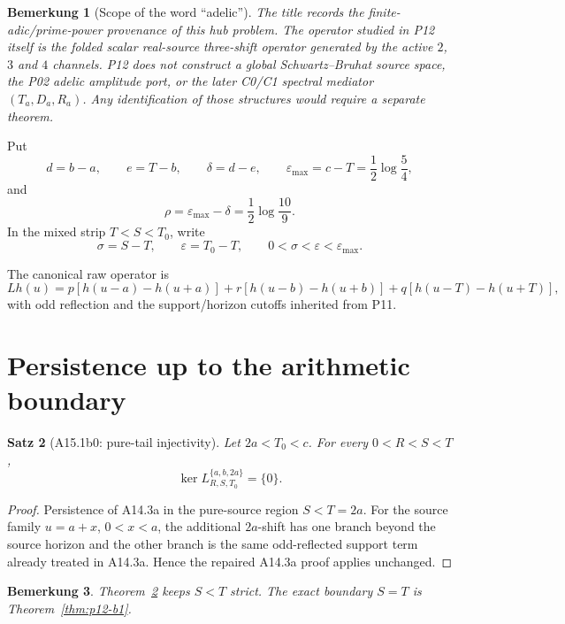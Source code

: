 \documentclass[11pt,a4paper]{amsart}
\newtheorem{theorem}{Satz}[section]
\newtheorem{remark}[theorem]{Bemerkung}
\begin{document}
\begin{remark}[Scope of the word ``adelic'']
The title records the finite-adic/prime-power provenance of this hub problem.
The operator studied in P12 itself is the folded scalar real-source three-shift
operator generated by the active $2$, $3$ and $4$ channels. P12 does not
construct a global Schwartz--Bruhat source space, the P02 adelic amplitude
port, or the later C0/C1 spectral mediator $(T_a,D_a,R_a)$.
Any identification of those structures would require a separate theorem.
\end{remark}
Put
\[
d=b-a,\qquad
e=T-b,\qquad
\delta=d-e,\qquad
\varepsilon_{\max}=c-T=\frac12\log\frac54,
\]
and
\[
\rho=\varepsilon_{\max}-\delta
=\frac12\log\frac{10}{9}.
\]
In the mixed strip \(T<S<T_0\), write
\[
\sigma=S-T,\qquad
\varepsilon=T_0-T,
\qquad
0<\sigma<\varepsilon<\varepsilon_{\max}.
\]

The canonical raw operator is
\[
Lh(u)=
p[h(u-a)-h(u+a)]
+r[h(u-b)-h(u+b)]
+q[h(u-T)-h(u+T)],
\]
with odd reflection and the support/horizon cutoffs inherited from P11.

\section{Persistence up to the arithmetic boundary}\label{sec:p12-persistence}

\begin{theorem}[A15.1b0: pure-tail injectivity]\label{thm:p12-b0}
Let \(2a<T_0<c\). For every \(0<R<S<T\),
\[
\ker L_{R,S,T_0}^{\{a,b,2a\}}=\{0\}.
\]
\end{theorem}

\begin{proof}
Persistence of A14.3a in the pure-source region \(S<T=2a\).
For the source family \(u=a+x\), \(0<x<a\), the additional \(2a\)-shift
has one branch beyond the source horizon and the other branch is the same
odd-reflected support term already treated in A14.3a. Hence the repaired
A14.3a proof applies unchanged.
\end{proof}

\begin{remark}\label{rem:p12-b0-scope}
Theorem~\ref{thm:p12-b0} keeps \(S<T\) strict. The exact boundary
\(S=T\) is Theorem~\ref{thm:p12-b1}.
\end{remark}

















\end{document}
